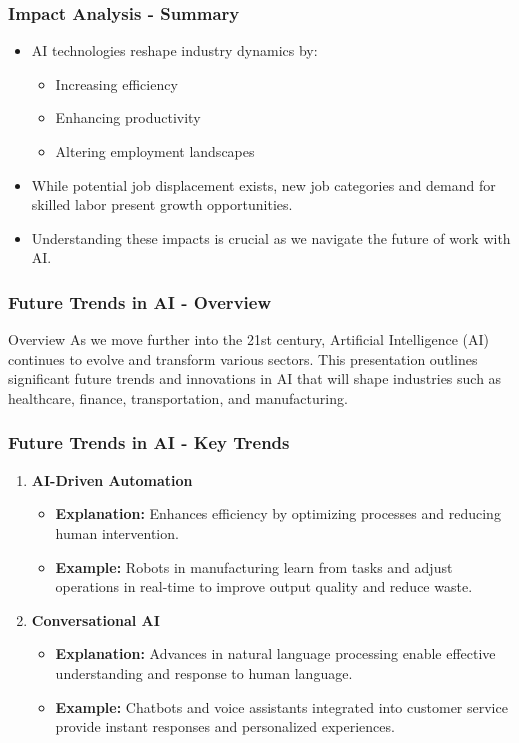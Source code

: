 \documentclass{beamer}
\begin{document}
\begin{frame}[fragile]
    \frametitle{Impact Analysis - Summary}
    \begin{itemize}
        \item AI technologies reshape industry dynamics by:
        \begin{itemize}
            \item Increasing efficiency
            \item Enhancing productivity
            \item Altering employment landscapes
        \end{itemize}
        \item While potential job displacement exists, new job categories and demand for skilled labor present growth opportunities.
        \item Understanding these impacts is crucial as we navigate the future of work with AI.
    \end{itemize}
\end{frame}

\begin{frame}[fragile]
    \frametitle{Future Trends in AI - Overview}
    \begin{block}{Overview}
        As we move further into the 21st century, Artificial Intelligence (AI) continues to evolve and transform various sectors. This presentation outlines significant future trends and innovations in AI that will shape industries such as healthcare, finance, transportation, and manufacturing.
    \end{block}
\end{frame}

\begin{frame}[fragile]
    \frametitle{Future Trends in AI - Key Trends}
    \begin{enumerate}
        \item \textbf{AI-Driven Automation}
        \begin{itemize}
            \item \textbf{Explanation:} Enhances efficiency by optimizing processes and reducing human intervention.
            \item \textbf{Example:} Robots in manufacturing learn from tasks and adjust operations in real-time to improve output quality and reduce waste.
        \end{itemize}
        
        \item \textbf{Conversational AI}
        \begin{itemize}
            \item \textbf{Explanation:} Advances in natural language processing enable effective understanding and response to human language.
            \item \textbf{Example:} Chatbots and voice assistants integrated into customer service provide instant responses and personalized experiences.
        \end{itemize}
    \end{enumerate}
\end{frame}
\end{document}
